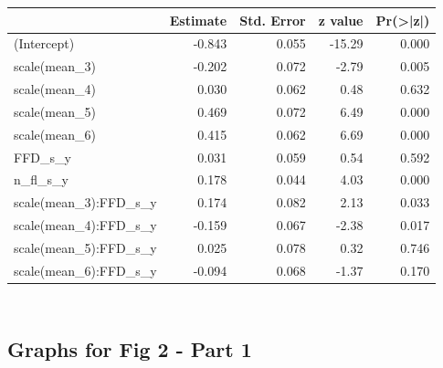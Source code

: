 \documentclass[
]{article}
\newenvironment{Shaded}{\begin{snugshade}}{\end{snugshade}}
\newcommand{\DataTypeTok}[1]{\textcolor[rgb]{0.13,0.29,0.53}{#1}}
\newcommand{\DecValTok}[1]{\textcolor[rgb]{0.00,0.00,0.81}{#1}}
\newcommand{\KeywordTok}[1]{\textcolor[rgb]{0.13,0.29,0.53}{\textbf{#1}}}
\newcommand{\NormalTok}[1]{#1}
\newcommand{\OperatorTok}[1]{\textcolor[rgb]{0.81,0.36,0.00}{\textbf{#1}}}
\begin{document}
\begin{Shaded}
\end{Shaded}

\begin{table}

\centering
\begin{tabular}[t]{l|r|r|r|r}
\hline
  & Estimate & Std. Error & z value & Pr(>|z|)\\
\hline
(Intercept) & -0.843 & 0.055 & -15.29 & 0.000\\
\hline
scale(mean\_3) & -0.202 & 0.072 & -2.79 & 0.005\\
\hline
scale(mean\_4) & 0.030 & 0.062 & 0.48 & 0.632\\
\hline
scale(mean\_5) & 0.469 & 0.072 & 6.49 & 0.000\\
\hline
scale(mean\_6) & 0.415 & 0.062 & 6.69 & 0.000\\
\hline
FFD\_s\_y & 0.031 & 0.059 & 0.54 & 0.592\\
\hline
n\_fl\_s\_y & 0.178 & 0.044 & 4.03 & 0.000\\
\hline
scale(mean\_3):FFD\_s\_y & 0.174 & 0.082 & 2.13 & 0.033\\
\hline
scale(mean\_4):FFD\_s\_y & -0.159 & 0.067 & -2.38 & 0.017\\
\hline
scale(mean\_5):FFD\_s\_y & 0.025 & 0.078 & 0.32 & 0.746\\
\hline
scale(mean\_6):FFD\_s\_y & -0.094 & 0.068 & -1.37 & 0.170\\
\hline
\end{tabular}
\centering
\begin{tabular}[t]{}
\hline

\hline
\end{tabular}
\centering
\begin{tabular}[t]{}
\hline

\hline
\end{tabular}
\end{table}

\hypertarget{graphs-for-fig-2---part-1}{%
\subsection{Graphs for Fig 2 - Part 1}\label{graphs-for-fig-2---part-1}}
\end{document}
